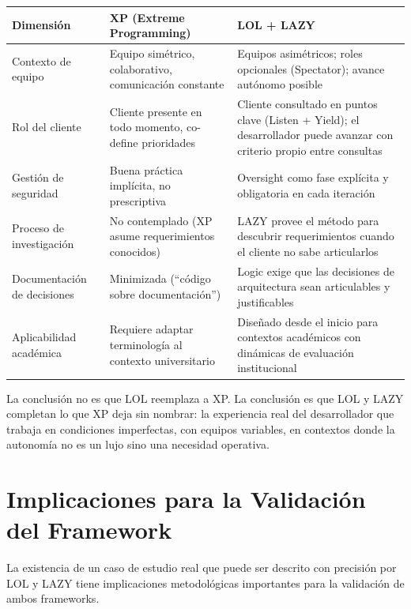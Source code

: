 \documentclass[14pt,a4paper,oneside]{extbook}
\begin{document}
\begin{table}[htbp]
\centering
\begin{tabular}{p{} p{} p{}}
\toprule
\textbf{Dimensión} & \textbf{XP (Extreme Programming)} & \textbf{LOL + LAZY} \\
\midrule
Contexto de equipo & Equipo simétrico, colaborativo, comunicación constante & Equipos asimétricos; roles opcionales (Spectator); avance autónomo posible \\
Rol del cliente & Cliente presente en todo momento, co-define prioridades & Cliente consultado en puntos clave (Listen + Yield); el desarrollador puede avanzar con criterio propio entre consultas \\
Gestión de seguridad & Buena práctica implícita, no prescriptiva & Oversight como fase explícita y obligatoria en cada iteración \\
Proceso de investigación & No contemplado (XP asume requerimientos conocidos) & LAZY provee el método para descubrir requerimientos cuando el cliente no sabe articularlos \\
Documentación de decisiones & Minimizada (\enquote{código sobre documentación}) & Logic exige que las decisiones de arquitectura sean articulables y justificables \\
Aplicabilidad académica & Requiere adaptar terminología al contexto universitario & Diseñado desde el inicio para contextos académicos con dinámicas de evaluación institucional \\
\bottomrule
\end{tabular}
\end{table}



La conclusión no es que LOL reemplaza a XP. La conclusión es que LOL y LAZY completan lo que XP deja sin nombrar: la experiencia real del desarrollador que trabaja en condiciones imperfectas, con equipos variables, en contextos donde la autonomía no es un lujo sino una necesidad operativa.





\section{Implicaciones para la Validación del Framework}

La existencia de un caso de estudio real que puede ser descrito con precisión por LOL y LAZY tiene implicaciones metodológicas importantes para la validación de ambos frameworks.
\end{document}
